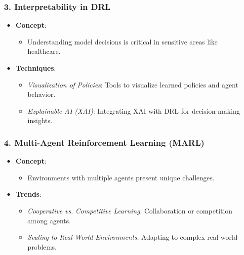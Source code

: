 \documentclass{beamer}
\begin{document}
\begin{frame}[fragile]
    \frametitle{3. Interpretability in DRL}
    \begin{itemize}
        \item \textbf{Concept}:
        \begin{itemize}
            \item Understanding model decisions is critical in sensitive areas like healthcare.
        \end{itemize}
        \item \textbf{Techniques}:
        \begin{itemize}
            \item \textit{Visualization of Policies}: Tools to visualize learned policies and agent behavior.
            \item \textit{Explainable AI (XAI)}: Integrating XAI with DRL for decision-making insights.
        \end{itemize}
    \end{itemize}
\end{frame}

\begin{frame}[fragile]
    \frametitle{4. Multi-Agent Reinforcement Learning (MARL)}
    \begin{itemize}
        \item \textbf{Concept}:
        \begin{itemize}
            \item Environments with multiple agents present unique challenges.
        \end{itemize}
        \item \textbf{Trends}:
        \begin{itemize}
            \item \textit{Cooperative vs. Competitive Learning}: Collaboration or competition among agents.
            \item \textit{Scaling to Real-World Environments}: Adapting to complex real-world problems.
        \end{itemize}
    \end{itemize}
\end{frame}
\end{document}

